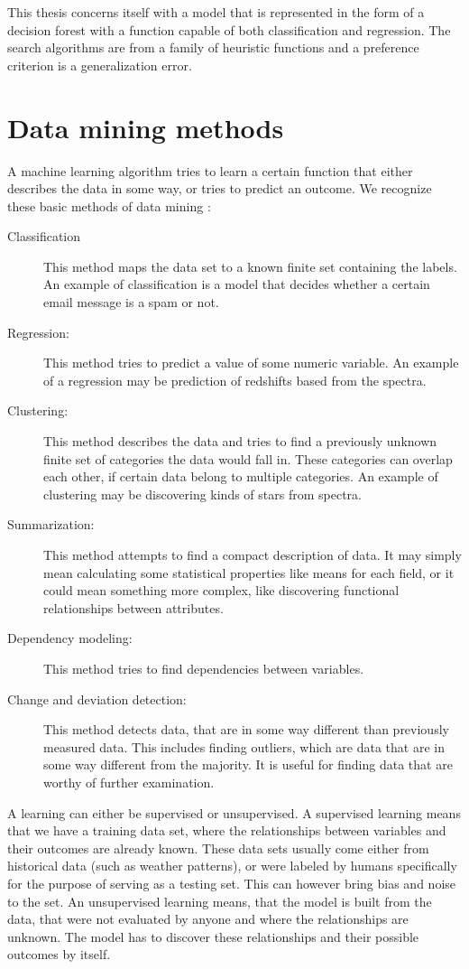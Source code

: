 \documentclass[thesis=B,english]{FITthesis}[2012/10/20]
\begin{document}
This thesis concerns itself with a model that is represented in the form of a decision forest with a function capable of both classification and regression. The search algorithms are from a family of heuristic functions and a preference criterion is a generalization error.

\section{Data mining methods}
A machine learning algorithm tries to learn a certain function that either describes the data in some way, or tries to predict an outcome. We recognize these basic methods of data mining \cite{fayyad1996data}:
\begin{description}
\item [Classification] This method maps the data set to a known finite set containing the labels. An example of classification is a model that decides whether a certain email message is a spam or not.
\item [Regression:] This method tries to predict a value of some numeric variable. An example of a regression may be prediction of redshifts based from the spectra.
\item [Clustering:] This method describes the data and tries to find a previously unknown finite set of categories the data would fall in. These categories can overlap each other, if certain data belong to multiple categories. An example of clustering may be discovering kinds of stars from spectra.
\item [Summarization:] This method attempts to find a compact description of data. It may simply mean calculating some statistical properties like means for each field, or it could mean something more complex, like discovering functional relationships between attributes.
\item [Dependency modeling:] This method tries to find dependencies between variables. 
\item [Change and deviation detection:] This method detects data, that are in some way different than previously measured data. This includes finding outliers, which are data that are in some way different from the majority. It is useful for finding data that are worthy of further examination.
\end{description}

A learning can either be supervised or unsupervised. A supervised learning means that we have a training data set, where the relationships between variables and their outcomes are already known. These data sets usually come either from historical data (such as weather patterns), or were labeled by humans specifically for the purpose of serving as a testing set. This can however bring bias and noise to the set. An unsupervised learning means, that the model is built from the data, that were not evaluated by anyone and where the relationships are unknown. The model has to discover these relationships and their possible outcomes by itself.
\end{document}
